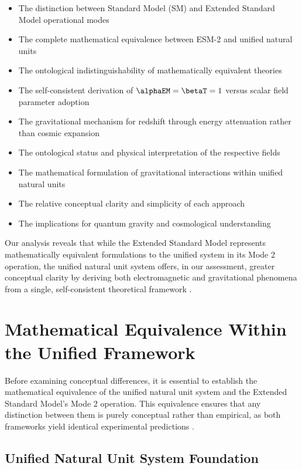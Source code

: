 	\begin{itemize}
		\item The distinction between Standard Model (SM) and Extended Standard Model operational modes
		\item The complete mathematical equivalence between ESM-2 and unified natural units
		\item The ontological indistinguishability of mathematically equivalent theories
		\item The self-consistent derivation of $\alphaEM = \betaT = 1$ versus scalar field parameter adoption
		\item The gravitational mechanism for redshift through energy attenuation rather than cosmic expansion \cite{Adams1925,Pound1960}
		\item The ontological status and physical interpretation of the respective fields
		\item The mathematical formulation of gravitational interactions within unified natural units \cite{pascher_lagrangian_2025}
		\item The relative conceptual clarity and simplicity of each approach
		\item The implications for quantum gravity and cosmological understanding
	\end{itemize}
	
	Our analysis reveals that while the Extended Standard Model represents mathematically equivalent formulations to the unified system in its Mode 2 operation, the unified natural unit system offers, in our assessment, greater conceptual clarity by deriving both electromagnetic and gravitational phenomena from a single, self-consistent theoretical framework \cite{pascher_pragmatic_2025}.
	
	\section{Mathematical Equivalence Within the Unified Framework}
	\label{sec:mathematical_equivalence}
	
	Before examining conceptual differences, it is essential to establish the mathematical equivalence of the unified natural unit system and the Extended Standard Model's Mode 2 operation. This equivalence ensures that any distinction between them is purely conceptual rather than empirical, as both frameworks yield identical experimental predictions \cite{pascher_unified_2025}.
	
	\subsection{Unified Natural Unit System Foundation}
	\label{subsec:unified_foundation}
	

